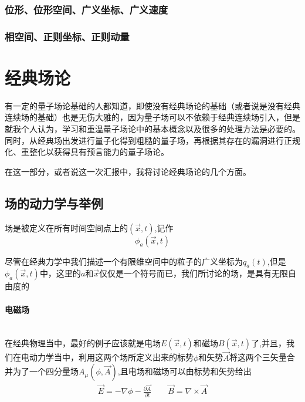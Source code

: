 \documentclass{article}
\begin{document}
\subsubsection{位形、位形空间、广义坐标、广义速度}




\subsubsection{相空间、正则坐标、正则动量}
































\section{经典场论}
有一定的量子场论基础的人都知道，即使没有经典场论的基础（或者说是没有经典连续场的基础）也是无伤大雅的，因为量子场可以不依赖于经典连续场引入，但是就我个人认为，学习和重温量子场论中的基本概念以及很多的处理方法是必要的。同时，从经典场出发进行量子化得到粗糙的量子场，再根据其存在的漏洞进行正规化、重整化以获得具有预言能力的量子场论。

在这一部分，或者说这一次汇报中，我将讨论经典场论的几个方面。

\subsection{场的动力学与举例}
场是被定义在所有时间空间点上的$(\vec{x},t)$,记作$$\phi_a(\vec{x},t)$$

尽管在经典力学中我们描述一个有限维空间中的粒子的广义坐标为$q_a(t)$,但是$\phi_a(\vec{x},t)$中，这里的$a$和$\vec{x}$仅仅是一个符号而已，我们所讨论的场，是具有无限自由度的
\paragraph{电磁场}\ \\
在经典物理当中，最好的例子应该就是电场$E(\vec{x},t)$和磁场$B(\vec{x},t)$了,并且，我们在电动力学当中，利用这两个场所定义出来的标势$\phi$和矢势$\vec{A}$将这两个三矢量合并为了一个四分量场$A_\mu(\phi,\vec{A})$,且电场和磁场可以由标势和矢势给出
\begin{align*}
    \vec{E}=-\nabla\phi-\frac{\partial\vec{A}}{\partial t}\quad\quad\vec{B}=\nabla\times\vec{A}
\end{align*}
\end{document}
